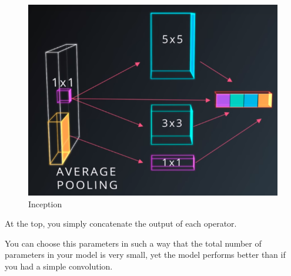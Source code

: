 \documentclass[11pt, a4paper]{article}
\begin{document}
 \begin{figure}[htpb!]
 	\centering
 	\includegraphics[width=0.8\linewidth]{inception}
 	\caption{Inception}
 	\label{fig:inception}
 \end{figure}


At the top, you simply concatenate the output of each operator. 

You can choose this parameters in such a way that the total number of parameters in your model is very small, yet the model performs better than if you had a simple convolution. 
\end{document}
